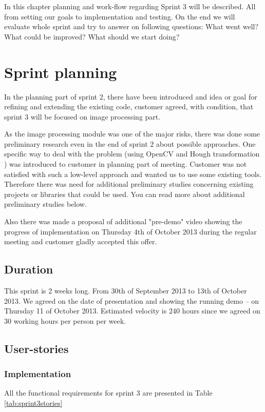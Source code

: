 In this chapter planning and work-flow regarding Sprint 3 will be described. 
All from setting our goals to implementation and testing. On the end we will evaluate whole sprint and try to answer on following questions: What went well? What could be improved? What should we start doing?  

\section{Sprint planning}
In the planning part of sprint 2, there have been introduced and idea or goal for refining and extending the existing code, customer agreed, with condition, that sprint 3 will be focused on image processing part.

As the image processing module was one of the major risks, there was done some preliminary research even in the end of sprint 2 about possible approaches.
One specific way to deal with the problem (using OpenCV and Hough transformation \cite{Duda:1972:UHT:361237.361242}) was introduced to customer in planning part of meeting.
Customer was not satisfied with such a low-level approach and wanted us to use some existing tools.
Therefore there was need for additional preliminary studies concerning existing projects or libraries that could be used.
You can read more about additional preliminary studies below.

Also there was made a proposal of additional "pre-demo" video showing the progress of implementation on Thursday 4th of October 2013 during the regular meeting and customer gladly accepted this offer.


\subsection{Duration}
This sprint is 2 weeks long. From 30th of September 2013 to 13th of October 2013.
We agreed on the date of presentation and showing the running demo -- on Thursday 11 of October 2013.
Estimated velocity is 240 hours since we agreed on 30 working hours per person per week.

\subsection{User-stories}

\subsubsection*{Implementation}
All the functional requirements for sprint 3 are presented in Table \ref{tab:sprint3stories}

